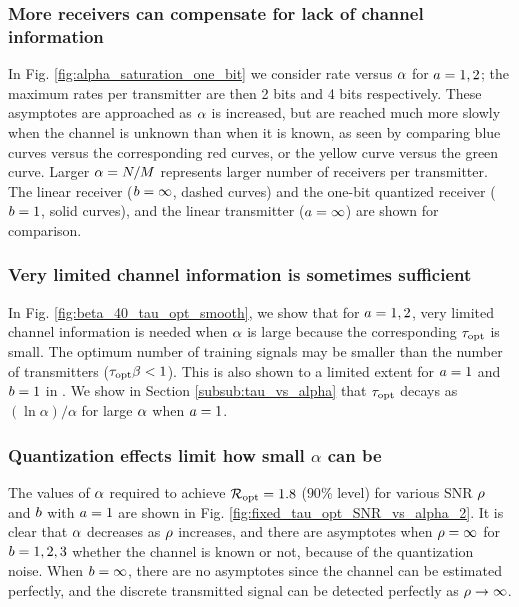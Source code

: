 \documentclass[12pt, draftclsnofoot,journal,onecolumn]{IEEEtran}
\begin{document}
\subsubsection{More receivers can compensate for lack of channel information}
In Fig. \ref{fig:alpha_saturation_one_bit} we consider rate versus $\alpha$ for $a=1,2$; the maximum rates per transmitter are then 2 bits and 4 bits respectively. These asymptotes are approached as $\alpha$ is increased, but are reached much more slowly when the channel is unknown than when it is known, as seen by comparing blue curves versus the corresponding red curves, or the yellow curve versus the green curve.  Larger $\alpha=N/M$ represents larger number of receivers per transmitter.  The linear receiver ($b=\infty$, dashed curves) and the one-bit quantized receiver ($b=1$, solid curves), and the linear transmitter ($a=\infty$) are shown for comparison.

\subsubsection{Very limited channel information is sometimes sufficient}
In Fig. \ref{fig:beta_40_tau_opt_smooth}, we show that for $a=1,2$, very limited channel information is needed when $\alpha$ is large because the corresponding $\tau_{{\rm opt}}$ is small. The optimum number of training signals may be smaller than the number of transmitters ($\tau_{{\rm opt}}\beta<1$).  This is also shown to a limited extent for $a=1$ and $b=1$ in \cite{kang2019training,gao2019channel}.  We show in Section \ref{subsub:tau_vs_alpha} that $\tau_{{\rm opt}}$ decays as $(\ln\alpha)/\alpha$ for large $\alpha$ when $a=1$.

\subsubsection{Quantization effects limit how small $\alpha$ can be}
The values of $\alpha$ required to achieve $\mathcal{R}_{\rm opt}=1.8$ ($90\%$ level) for various SNR $\rho$ and $b$ with $a=1$ are shown in Fig. \ref{fig:fixed_tau_opt_SNR_vs_alpha_2}. It is clear that $\alpha$ decreases as $\rho$ increases, and there are asymptotes when $\rho=\infty$ for $b=1,2,3$ whether the channel is known or not, because of the quantization noise.  When $b=\infty$, there are no asymptotes since the channel can be estimated perfectly, and the discrete transmitted signal can be detected perfectly as $\rho\rightarrow\infty$.
\end{document}

